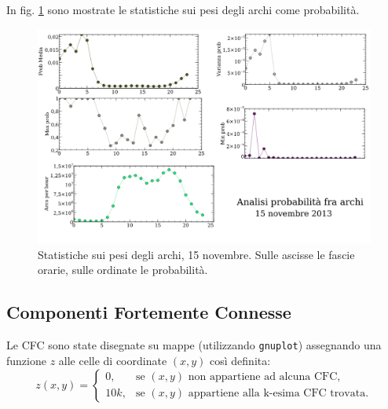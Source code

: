\documentclass[10pt,a4paper]{article}
\begin{document}
In fig. \ref{img:probs} sono mostrate le statistiche sui pesi degli archi come probabilità.
\begin{figure}
 \includegraphics[scale=.6]{img/probs15nov.png}
 \caption{Statistiche sui pesi degli archi, 15 novembre. Sulle ascisse le fascie orarie, sulle ordinate le probabilità.}
 \label{img:probs}
\end{figure}

\subsection{Componenti Fortemente Connesse}

Le CFC sono state disegnate su mappe (utilizzando \verb!gnuplot!) assegnando una funzione $z$ alle celle di
coordinate $(x,y)$ così definita:
$$
z(x,y) =
\begin{cases}
0, & \text{se $(x,y)$ non appartiene ad alcuna CFC,} \\
10k, & \text{se $(x,y)$ appartiene alla k-esima CFC trovata.}
\end{cases}
$$
\end{document}
